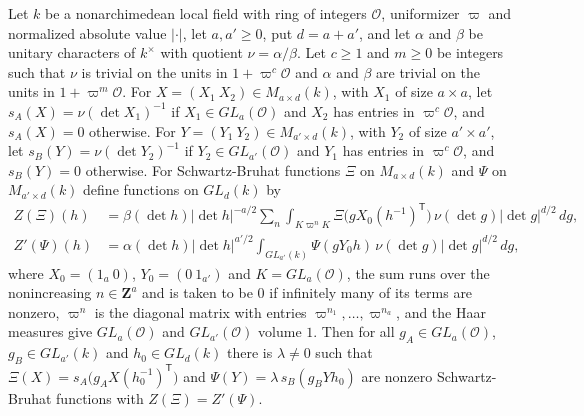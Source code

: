 \begin{lemma}\label{th-bottom-split-zeta}
Let $k$ be a nonarchimedean local field with ring of integers $\mathcal O$,
uniformizer $\varpi$ and normalized absolute value $|\cdot|$, let $a,a'\geq0$,
put $d=a+a'$, and let $\alpha$ and $\beta$ be unitary characters of $k^\times$
with quotient $\nu=\alpha/\beta$. Let $c\geq1$ and $m\geq0$ be integers such
that $\nu$ is trivial on the units in $1+\varpi^c\mathcal O$ and $\alpha$ and
$\beta$ are trivial on the units in $1+\varpi^m\mathcal O$. For
$X=(X_1\ X_2)\in M_{a\times d}(k)$, with $X_1$ of size $a\times a$, let
$s_A(X)=\nu(\det X_1)^{-1}$ if $X_1\in GL_a(\mathcal O)$ and $X_2$ has entries
in $\varpi^c\mathcal O$, and $s_A(X)=0$ otherwise. For
$Y=(Y_1\ Y_2)\in M_{a'\times d}(k)$, with $Y_2$ of size $a'\times a'$, let
$s_B(Y)=\nu(\det Y_2)^{-1}$ if $Y_2\in GL_{a'}(\mathcal O)$ and $Y_1$ has
entries in $\varpi^c\mathcal O$, and $s_B(Y)=0$ otherwise. For Schwartz-Bruhat
functions $\Xi$ on $M_{a\times d}(k)$ and $\Psi$ on $M_{a'\times d}(k)$ define
functions on $GL_d(k)$ by
\begin{align*}
Z(\Xi)(h)&=\beta(\det h)|\det h|^{-a/2}\sum_n\int_{K\varpi^nK}
\Xi\bigl(gX_0(h^{-1})^{\mathsf T}\bigr)\,\nu(\det g)|\det g|^{d/2}\,dg,\\
Z'(\Psi)(h)&=\alpha(\det h)|\det h|^{a'/2}\int_{GL_{a'}(k)}
\Psi(gY_0h)\,\nu(\det g)|\det g|^{d/2}\,dg,
\end{align*}
where $X_0=(1_a\ 0)$, $Y_0=(0\ 1_{a'})$ and $K=GL_a(\mathcal O)$, the sum runs
over the nonincreasing $n\in\mathbf Z^a$ and is taken to be $0$ if infinitely
many of its terms are nonzero, $\varpi^n$ is the diagonal matrix with entries
$\varpi^{n_1},\ldots,\varpi^{n_a}$, and the Haar measures give $GL_a(\mathcal O)$
and $GL_{a'}(\mathcal O)$ volume $1$. Then for all $g_A\in GL_a(\mathcal O)$,
$g_B\in GL_{a'}(k)$ and $h_0\in GL_d(k)$ there is $\lambda\neq0$ such that
$\Xi(X)=s_A\bigl(g_AX(h_0^{-1})^{\mathsf T}\bigr)$ and
$\Psi(Y)=\lambda\,s_B(g_BYh_0)$ are nonzero Schwartz-Bruhat functions with
$Z(\Xi)=Z'(\Psi)$.
\end{lemma}
